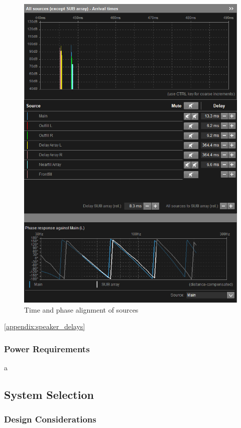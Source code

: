         \begin{figure}[H]
            \centering
            \includegraphics{Images/delay_alignment.png}
            \caption{Time and phase alignment of sources}
            \label{fig:delay_alignment}
        \end{figure}

        \ref{appendix:speaker_delays}

    \subsubsection{Power Requirements}
        a
    
    \subsection{System Selection}
        \subsubsection{Design Considerations}

